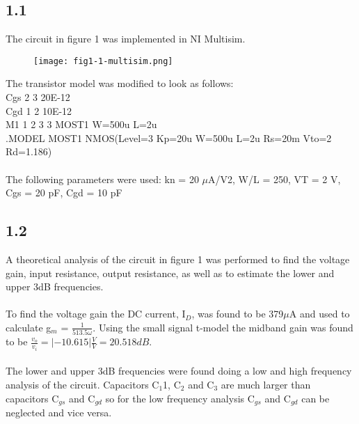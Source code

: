 \subsection*{1.1}
  The circuit in figure 1 was implemented in NI Multisim.
    \begin{figure}[h!]
        \centering
        \texttt{[image: fig1-1-multisim.png]}
    \end{figure} 
  The  transistor  model was modified to look as follows:\\
  Cgs  2 3 20E-12\\ 
  Cgd 1 2 10E-12\\
  M1 1 2 3 3 MOST1 W=500u L=2u\\
  .MODEL MOST1 NMOS(Level=3 Kp=20u W=500u L=2u Rs=20m Vto=2 Rd=1.186)\\\\

  The following parameters were used: kn =  20  $\mu$A/V2,  W/L =  250,  VT =  2  V,  Cgs =  20  pF, Cgd = 10 pF\\

\subsection*{1.2}

  A theoretical analysis of the circuit in figure 1 was performed to find the voltage gain, input resistance, output resistance, as well as to estimate the lower and upper 3dB frequencies.\\\\

  To find the voltage gain the DC current, I$_D$, was found to be 379$\mu$A and used to calculate g$_m$ = $\frac{1}{513.5 \omega}$. Using the small signal t-model the midband gain was found to be $\frac{v_o}{v_i} = |-10.615| \frac{V}{V} = 20.518 dB$.\\\\

  The lower and upper 3dB frequencies were found doing a low and high frequency analysis of the circuit. Capacitors C$_1$1, C$_2$ and C$_3$ are much larger than capacitors C$_{gs}$ and C$_{gd}$ so for the low frequency analysis C$_{gs}$ and C$_{gd}$ can be neglected and vice versa.\\

